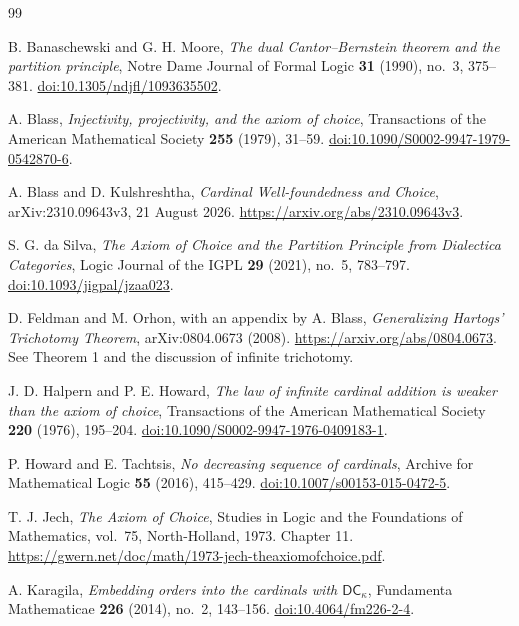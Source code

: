 \documentclass[11pt,a4paper]{article}
\theoremstyle{definition}
\theoremstyle{remark}
\begin{document}
\begin{thebibliography}{99}\small

 B. Banaschewski and G. H. Moore, \emph{The dual Cantor--Bernstein theorem and the partition principle}, Notre Dame Journal of Formal Logic \textbf{31} (1990), no.~3, 375--381. \href{https://doi.org/10.1305/ndjfl/1093635502}{doi:10.1305/ndjfl/1093635502}.

 A. Blass, \emph{Injectivity, projectivity, and the axiom of choice}, Transactions of the American Mathematical Society \textbf{255} (1979), 31--59. \href{https://doi.org/10.1090/S0002-9947-1979-0542870-6}{doi:10.1090/S0002-9947-1979-0542870-6}.

 A. Blass and D. Kulshreshtha, \emph{Cardinal Well-foundedness and Choice}, arXiv:2310.09643v3, 21 August 2026. \url{https://arxiv.org/abs/2310.09643v3}.

 S. G. da Silva, \emph{The Axiom of Choice and the Partition Principle from Dialectica Categories}, Logic Journal of the IGPL \textbf{29} (2021), no.~5, 783--797. \href{https://doi.org/10.1093/jigpal/jzaa023}{doi:10.1093/jigpal/jzaa023}.

 D. Feldman and M. Orhon, with an appendix by A. Blass, \emph{Generalizing Hartogs' Trichotomy Theorem}, arXiv:0804.0673 (2008). \url{https://arxiv.org/abs/0804.0673}. See Theorem 1 and the discussion of infinite trichotomy.

 J. D. Halpern and P. E. Howard, \emph{The law of infinite cardinal addition is weaker than the axiom of choice}, Transactions of the American Mathematical Society \textbf{220} (1976), 195--204. \href{https://doi.org/10.1090/S0002-9947-1976-0409183-1}{doi:10.1090/S0002-9947-1976-0409183-1}.

 P. Howard and E. Tachtsis, \emph{No decreasing sequence of cardinals}, Archive for Mathematical Logic \textbf{55} (2016), 415--429. \href{https://doi.org/10.1007/s00153-015-0472-5}{doi:10.1007/s00153-015-0472-5}.

 T. J. Jech, \emph{The Axiom of Choice}, Studies in Logic and the Foundations of Mathematics, vol.~75, North-Holland, 1973. Chapter 11. \url{https://gwern.net/doc/math/1973-jech-theaxiomofchoice.pdf}.

 A. Karagila, \emph{Embedding orders into the cardinals with $\mathsf{DC}_\kappa$}, Fundamenta Mathematicae \textbf{226} (2014), no.~2, 143--156. \href{https://doi.org/10.4064/fm226-2-4}{doi:10.4064/fm226-2-4}.


\end{thebibliography}
\end{document}
